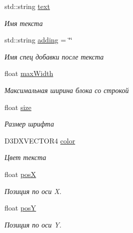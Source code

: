 \begin{DoxyCompactItemize}
\item 
std\+::string \hyperlink{struct_interface_element_class_1_1_string_info_a6f6499237752c482c74d9576df4c0da5}{text}
\begin{DoxyCompactList}\small\item\em Имя текста \end{DoxyCompactList}\item 
std\+::string \hyperlink{struct_interface_element_class_1_1_string_info_aed145ee0af7f1dbcc659d2cd78cf8a22}{adding} = \char`\"{}\char`\"{}
\begin{DoxyCompactList}\small\item\em Имя спец добавки после текста \end{DoxyCompactList}\item 
float \hyperlink{struct_interface_element_class_1_1_string_info_ad2f6cc76744dc24bd23c5969e1b46e29}{max\+Width}
\begin{DoxyCompactList}\small\item\em Максимальная ширина блока со строкой \end{DoxyCompactList}\item 
float \hyperlink{struct_interface_element_class_1_1_string_info_a887a6fe33b3f2f451c9f8db886ae4a41}{size}
\begin{DoxyCompactList}\small\item\em Размер шрифта \end{DoxyCompactList}\item 
D3\+D\+X\+V\+E\+C\+T\+O\+R4 \hyperlink{struct_interface_element_class_1_1_string_info_ad1ddbde8918aec3abfe70de793bda9d4}{color}
\begin{DoxyCompactList}\small\item\em Цвет текста \end{DoxyCompactList}\item 
float \hyperlink{struct_interface_element_class_1_1_string_info_a56352009820591d1a258d7eec53adeff}{posX}
\begin{DoxyCompactList}\small\item\em Позиция по оси X. \end{DoxyCompactList}\item 
float \hyperlink{struct_interface_element_class_1_1_string_info_ab785a8e2fca2c49f54a84baec27ebe73}{posY}
\begin{DoxyCompactList}\small\item\em Позиция по оси Y. \end{DoxyCompactList}\end{DoxyCompactItemize}



